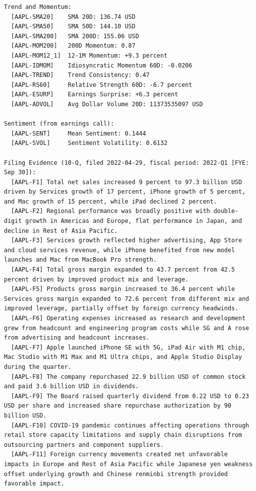 \documentclass{article}
\begin{document}
\begin{lstlisting}[backgroundcolor=\color{promptbg}]
Trend and Momentum:
  [AAPL-SMA20]    SMA 20D: 136.74 USD
  [AAPL-SMA50]    SMA 50D: 144.10 USD
  [AAPL-SMA200]   SMA 200D: 155.06 USD
  [AAPL-MOM200]   200D Momentum: 0.87
  [AAPL-MOM12_1]  12-1M Momentum: +9.3 percent
  [AAPL-IDMOM]    Idiosyncratic Momentum 60D: -0.0206
  [AAPL-TREND]    Trend Consistency: 0.47
  [AAPL-RS60]     Relative Strength 60D: -6.7 percent
  [AAPL-ESURP]    Earnings Surprise: +6.3 percent
  [AAPL-ADVOL]    Avg Dollar Volume 20D: 11373535097 USD

Sentiment (from earnings call):
  [AAPL-SENT]     Mean Sentiment: 0.1444
  [AAPL-SVOL]     Sentiment Volatility: 0.6132

Filing Evidence (10-Q, filed 2022-04-29, fiscal period: 2022-Q1 [FYE: Sep 30]):
  [AAPL-F1] Total net sales increased 9 percent to 97.3 billion USD driven by Services growth of 17 percent, iPhone growth of 5 percent, and Mac growth of 15 percent, while iPad declined 2 percent.
  [AAPL-F2] Regional performance was broadly positive with double-digit growth in Americas and Europe, flat performance in Japan, and decline in Rest of Asia Pacific.
  [AAPL-F3] Services growth reflected higher advertising, App Store and cloud services revenue, while iPhone benefited from new model launches and Mac from MacBook Pro strength.
  [AAPL-F4] Total gross margin expanded to 43.7 percent from 42.5 percent driven by improved product mix and leverage.
  [AAPL-F5] Products gross margin increased to 36.4 percent while Services gross margin expanded to 72.6 percent from different mix and improved leverage, partially offset by foreign currency headwinds.
  [AAPL-F6] Operating expenses increased as research and development grew from headcount and engineering program costs while SG and A rose from advertising and headcount increases.
  [AAPL-F7] Apple launched iPhone SE with 5G, iPad Air with M1 chip, Mac Studio with M1 Max and M1 Ultra chips, and Apple Studio Display during the quarter.
  [AAPL-F8] The company repurchased 22.9 billion USD of common stock and paid 3.6 billion USD in dividends.
  [AAPL-F9] The Board raised quarterly dividend from 0.22 USD to 0.23 USD per share and increased share repurchase authorization by 90 billion USD.
  [AAPL-F10] COVID-19 pandemic continues affecting operations through retail store capacity limitations and supply chain disruptions from outsourcing partners and component suppliers.
  [AAPL-F11] Foreign currency movements created net unfavorable impacts in Europe and Rest of Asia Pacific while Japanese yen weakness offset underlying growth and Chinese renminbi strength provided favorable impact.

\end{lstlisting}
\end{document}

